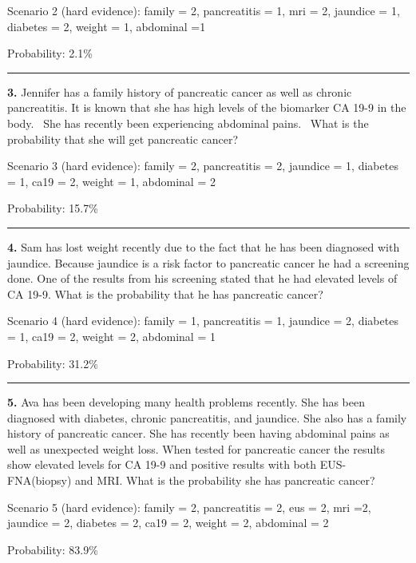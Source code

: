 \documentclass[12pt]{article}
\begin{document}
Scenario 2 (hard evidence):
family = 2, pancreatitis = 1, mri = 2, jaundice = 1, diabetes = 2, weight = 1, abdominal =1

Probability: 2.1\%


\vspace*{0.2in}
\hrule
\vspace*{0.2in}



{\bf 3.} Jennifer has a family history of pancreatic cancer as well as chronic pancreatitis.  It is known that she has high levels of the biomarker CA 19-9 in the body.  She has recently been experiencing abdominal pains.  What is the probability that she will get pancreatic cancer?

Scenario 3 (hard evidence):
family = 2, pancreatitis = 2, jaundice = 1, diabetes = 1, ca19 = 2, weight = 1, abdominal = 2

Probability: 15.7\%


\vspace*{0.2in}
\hrule
\vspace*{0.2in}


{\bf 4.} Sam has lost weight recently due to the fact that he has been diagnosed with jaundice.  Because jaundice is a risk factor to pancreatic cancer he had a screening done.  One of the results from his screening stated that he had elevated levels of CA 19-9.  What is the probability that he has pancreatic cancer?

Scenario 4 (hard evidence):
family = 1, pancreatitis = 1, jaundice = 2, diabetes = 1, ca19 = 2, weight = 2, abdominal = 1

Probability: 31.2\%


\vspace*{0.2in}
\hrule
\vspace*{0.2in}


{\bf 5.}
Ava has been developing many health problems recently. She has been diagnosed with diabetes, chronic pancreatitis, and jaundice. She also has a family history of pancreatic cancer.  She has recently been having abdominal pains as well as unexpected weight loss.  When tested for pancreatic cancer the results show elevated levels for CA 19-9 and positive results with both EUS-FNA(biopsy) and MRI.  What is the probability she has pancreatic cancer?

Scenario 5 (hard evidence):
family = 2, pancreatitis = 2, eus = 2, mri =2, jaundice = 2, diabetes = 2, ca19 = 2, weight = 2, abdominal = 2

Probability: 83.9\%
\end{document}
